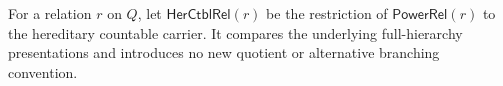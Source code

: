 \begin{definition}
For a relation $r$ on $Q$, let $\mathsf{HerCtblRel}(r)$ be the restriction
of $\mathsf{PowerRel}(r)$ to the hereditary countable carrier.  It compares
the underlying full-hierarchy presentations and introduces no new quotient
or alternative branching convention.
\end{definition}
